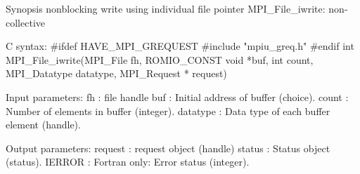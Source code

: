 Synopsis
nonblocking write using individual file pointer
MPI_File_iwrite: non-collective

C syntax:
#ifdef HAVE_MPI_GREQUEST
#include "mpiu_greq.h"
#endif
int MPI_File_iwrite(MPI_File fh,
    ROMIO_CONST void *buf, int count, MPI_Datatype datatype, 
    MPI_Request * request)

Input parameters:
fh  : file handle
buf : Initial address of buffer (choice). 
count : Number of elements in buffer (integer). 
datatype : Data type of each buffer element (handle). 

Output parameters:
request : request object (handle) 
status : Status object (status). 
IERROR : Fortran only: Error status (integer). 
